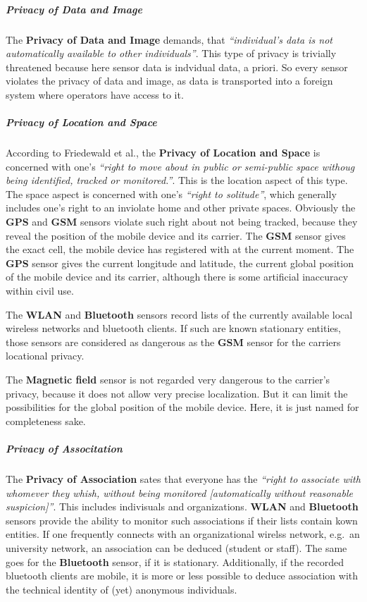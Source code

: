 \subparagraph{Privacy of Data and Image}

The \textbf{Privacy of Data and Image} demands, that
\emph{``individual's data is not automatically available to other
individuals''}. This type of privacy is trivially threatened because
here sensor data is indvidual data, a priori. So every sensor violates
the privacy of data and image, as data is transported into a foreign
system where operators have access to it.

\subparagraph{Privacy of Location and Space}

According to Friedewald et al., the \textbf{Privacy of Location and
Space} is concerned with one's \emph{``right to move about in public or
semi-public space withoug being identified, tracked or monitored.''}.
This is the location aspect of this type. The space aspect is concerned
with one's \emph{``right to solitude''}, which generally includes one's
right to an inviolate home and other private spaces. Obviously the
\textbf{GPS} and \textbf{GSM} sensors violate such right about not being
tracked, because they reveal the position of the mobile device and its
carrier. The \textbf{GSM} sensor gives the exact cell, the mobile device
has registered with at the current moment. The \textbf{GPS} sensor gives
the current longitude and latitude, the current global position of the
mobile device and its carrier, although there is some artificial
inaccuracy within civil use.

The \textbf{WLAN} and \textbf{Bluetooth} sensors record lists of the
currently available local wireless networks and bluetooth clients. If
such are known stationary entities, those sensors are considered as
dangerous as the \textbf{GSM} sensor for the carriers locational
privacy.

The \textbf{Magnetic field} sensor is not regarded very dangerous to the
carrier's privacy, because it does not allow very precise localization.
But it can limit the possibilities for the global position of the mobile
device. Here, it is just named for completeness sake.

\subparagraph{Privacy of Associtation}

The \textbf{Privacy of Association} sates that everyone has the
\emph{``right to associate with whomever they whish, without being
monitored {[}automatically without reasonable suspicion{]}''}. This
includes indivisuals and organizations. \textbf{WLAN} and
\textbf{Bluetooth} sensors provide the ability to monitor such
associations if their lists contain kown entities. If one frequently
connects with an organizational wirelss network, e.g.~an university
network, an association can be deduced (student or staff). The same goes
for the \textbf{Bluetooth} sensor, if it is stationary. Additionally, if
the recorded bluetooth clients are mobile, it is more or less possible
to deduce association with the technical identity of (yet) anonymous
individuals.

